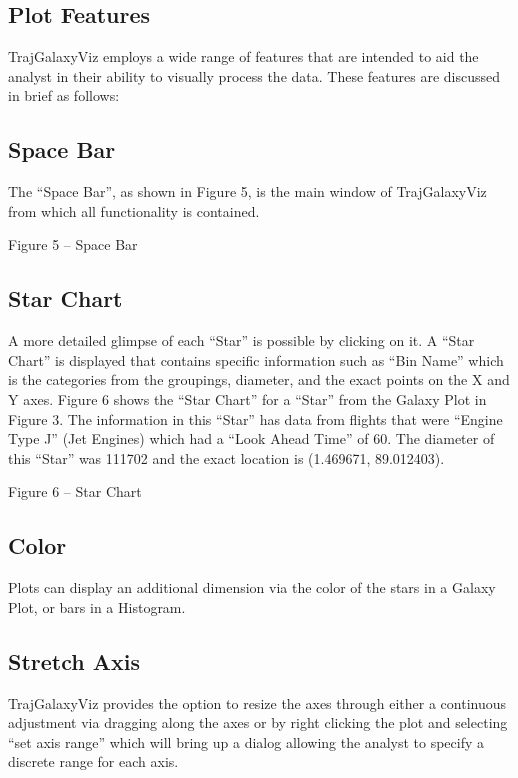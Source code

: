 \documentclass[]{article}
\begin{document}
\subsection{Plot Features}
\label{plotFeatures}
TrajGalaxyViz employs a wide range of features that are intended to aid the analyst in their ability to visually process the data. These features are discussed in brief as follows:

\subsection{Space Bar}
\label{spaceBar}
The “Space Bar”, as shown in Figure 5, is the main window of TrajGalaxyViz from which all functionality is contained.

Figure 5 – Space Bar

\subsection{Star Chart}
\label{starChart}
A more detailed glimpse of each “Star” is possible by clicking on it.  A “Star Chart” is displayed that contains specific information such as “Bin Name” which is the categories from the groupings, diameter, and the exact points on the X and Y axes.  Figure 6 shows the “Star Chart” for a “Star” from the Galaxy Plot in Figure 3.  The information in this “Star” has data from flights that were “Engine Type J” (Jet Engines) which had a “Look Ahead Time” of 60.   The diameter of this “Star” was 111702 and the exact location is (1.469671, 89.012403).




Figure 6 – Star Chart

\subsection{Color}
\label{color}
Plots can display an additional dimension via the color of the stars in a Galaxy Plot, or bars in a Histogram.

\subsection{Stretch Axis}
\label{stretchAxis}
TrajGalaxyViz provides the option to resize the axes through either a continuous adjustment via dragging along the axes or by right clicking the plot and selecting “set axis range” which will bring up a dialog allowing the analyst to specify a discrete range for each axis.
\end{document}
